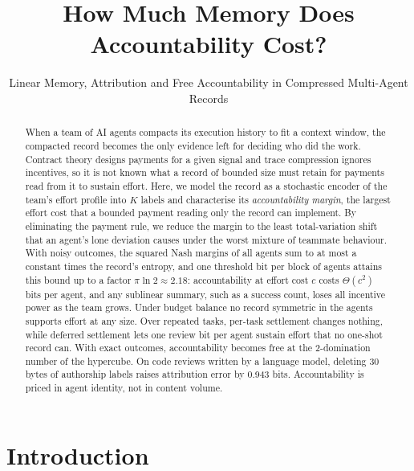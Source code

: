 \documentclass[sigconf,anonymous,acmthm=false]{acmart}
\theoremstyle{acmplain}
\theoremstyle{acmdefinition}
\begin{document}
\title{How Much Memory Does Accountability Cost?}
\subtitle{Linear Memory, Attribution and Free Accountability in Compressed Multi-Agent Records}

\begin{abstract}
When a team of AI agents compacts its execution history to fit a context window, the
compacted record becomes the only evidence left for deciding who did the work. Contract
theory designs payments for a given signal and trace compression ignores incentives, so it
is not known what a record of bounded size must retain for payments read from it to sustain
effort. Here, we model the record as a stochastic encoder of the team's effort profile into
$K$ labels and characterise its \emph{accountability margin}, the largest effort cost that a
bounded payment reading only the record can implement. By eliminating the payment rule, we
reduce the margin to the least total-variation shift that an agent's lone deviation causes
under the worst mixture of teammate behaviour. With noisy outcomes, the squared Nash margins
of all agents sum to at most a constant times the record's entropy, and one threshold bit per
block of agents attains this bound up to a factor $\pi\ln2\approx2.18$: accountability at
effort cost $c$ costs $\Theta(c^2)$ bits per agent, and any sublinear summary, such as a
success count, loses all incentive power as the team grows. Under budget balance no record
symmetric in the agents supports effort at any size. Over repeated tasks, per-task settlement
changes nothing, while deferred settlement lets one review bit per agent sustain effort that
no one-shot record can. With exact outcomes, accountability becomes free at the 2-domination
number of the hypercube. On code reviews written by a language model, deleting 30 bytes of
authorship labels raises attribution error by 0.943 bits. Accountability is priced in agent
identity, not in content volume.
\end{abstract}


\maketitle

\section{Introduction}\label{sec:intro}
\end{document}
